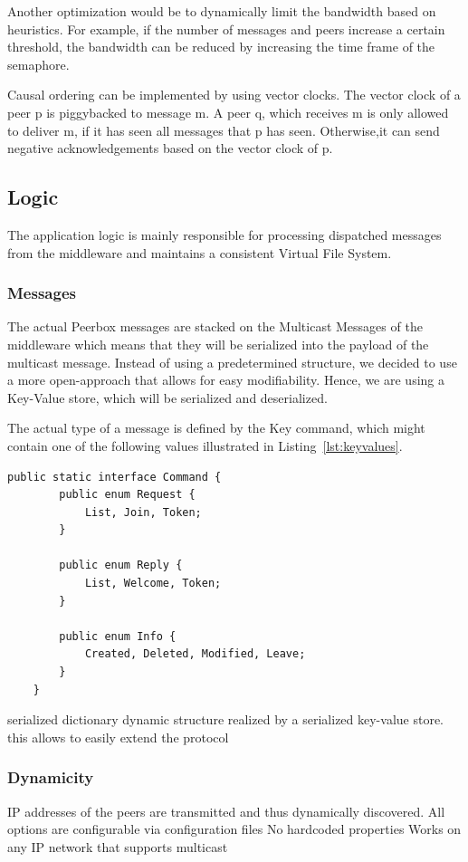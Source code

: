 Another optimization would be to dynamically limit the bandwidth based on heuristics. For example, if the number of messages and peers increase a certain threshold, the bandwidth can be reduced by increasing the time frame of the semaphore. 

Causal ordering can be implemented by using vector clocks. The vector clock of a peer p is piggybacked to message m. A peer q, which receives m is only allowed to deliver m, if it has seen all messages that p has seen. Otherwise,it can send negative acknowledgements based on the vector clock of p. 

\subsection{Logic}

The application logic is mainly responsible for processing dispatched messages from the middleware and maintains a consistent Virtual File System.
    
    \subsubsection{Messages}   
The actual Peerbox messages are stacked on the Multicast Messages of the middleware which means that they will be serialized into the payload of the multicast message. 
Instead of using a predetermined structure, we decided to use a more open-approach that allows for easy modifiability. Hence, we are using a Key-Value store, which will be serialized and deserialized. 

The actual type of a message is defined by the Key command, which might contain one of the following values illustrated in Listing~\ref{lst:keyvalues}.

\begin{lstlisting}[caption=Possible values of command]
public static interface Command {
		public enum Request {
			List, Join, Token;
		}

		public enum Reply {
			List, Welcome, Token;
		}

		public enum Info {
			Created, Deleted, Modified, Leave;
		}
	}
\end{lstlisting}
    serialized dictionary
    dynamic structure realized by a serialized key-value store. 
    this allows to easily extend the protocol

    \subsubsection{Dynamicity}
    IP addresses of the peers are transmitted and thus dynamically discovered.
    All options are configurable via configuration files
    No hardcoded properties
    Works on any IP network that supports multicast
    
